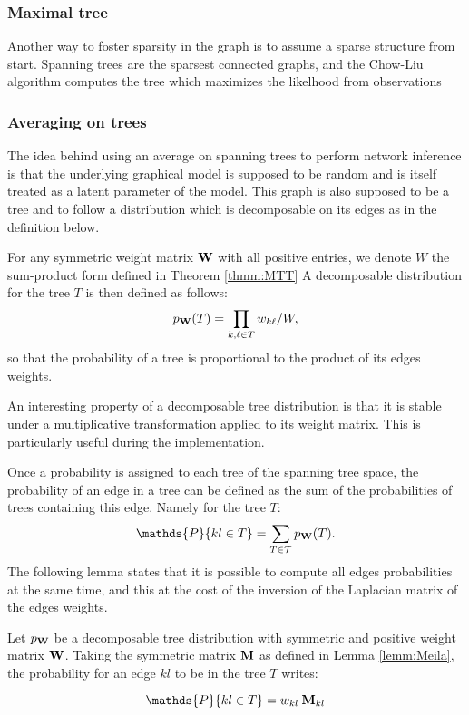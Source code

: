 
 \subsubsection{Maximal tree}
 Another way to foster sparsity in the graph is to assume a sparse structure from start. Spanning trees are the sparsest connected graphs, and  the Chow-Liu algorithm \citep{ChowLiu} computes the tree which maximizes the likelhood from observations
 \subsubsection{Averaging on trees}
 
 The idea behind using an average on spanning trees to perform network inference  is that the underlying graphical model is supposed to be random and is itself treated as a latent parameter of the model. This graph is also supposed to be a tree and to follow a distribution which is decomposable on its edges as in the definition below.
\begin{definition}
For any symmetric weight matrix ${\bf W}$ with all positive entries, we denote $W$ the sum-product form defined in Theorem \ref{thmm:MTT} A decomposable  distribution for the tree $T$ is then defined as follows:
$$p_{{\bf W}}(T) = \prod_{k,\ell \in T} w_{k\ell} / W ,$$
so that the probability of a tree is proportional to the product of its edges weights.
\end{definition}

An interesting property of a decomposable tree distribution is that it is stable under a multiplicative transformation applied to its weight matrix. This is particularly useful during the implementation.

Once a probability is assigned to each tree of the spanning tree space, the probability of an edge in a tree can be defined as the sum of the probabilities of trees containing this edge. Namely for the tree $T$:
$$\mathds{P}\{kl\in T\} = \sum_{T\in \mathcal{T}} p_{\Wbf}(T).$$
The following lemma  states that it is possible to compute all edges probabilities at the same time, and this at the cost of the inversion of the  Laplacian matrix of the edges weights.

\begin{lemma}  \label{lem:Kirshner}
    Let $p_{{\bf W}}$ be a decomposable tree distribution with symmetric and positive weight matrix ${\bf W}$. Taking the symmetric matrix ${\bf M}$ as defined in Lemma  \ref{lemm:Meila}, the probability for an edge $kl$ to be in the tree $T$ writes:
 
$$\mathds{P}\{kl\in T\} =  w_{kl}\: \Mbf_{kl}$$
\end{lemma}

